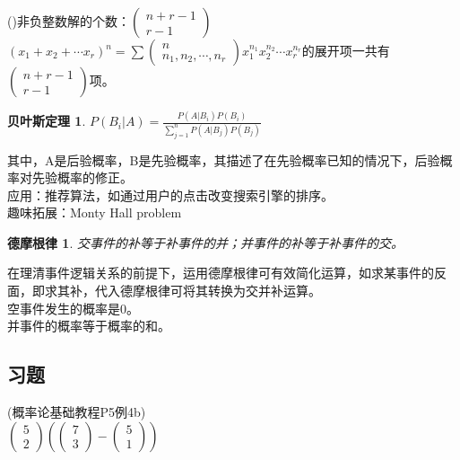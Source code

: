 \documentclass{book}%
\newtheorem{thm}{贝叶斯定理}
\newtheorem{demogen}{德摩根律}
\begin{document}
	()非负整数解的个数：$\begin{pmatrix}n+r-1\\r-1\end{pmatrix}$\\
	$(x_{1}+x_{2}+\cdots x_{r})^n=\sum\begin{pmatrix}n\\n_{1},n_{2},\cdots ,n_{r}\end{pmatrix}x_{1}^{n_{1}}x_{2}^{n_{2}}\cdots x_{r}^{n_{r}}$的展开项一共有$\begin{pmatrix}n+r-1\\r-1\end{pmatrix}$项。\\
	\begin{thm}
	$P(B_{i}|A)=\frac{P(A|B_{i})P(B_{i})}{\sum_{j=1}^{n}P(A|B_{j})P(B_{j})}$
    \end{thm}
    其中，A是后验概率，B是先验概率，其描述了在先验概率已知的情况下，后验概率对先验概率的修正。\\
    应用：推荐算法，如通过用户的点击改变搜索引擎的排序。\\
    趣味拓展：Monty Hall problem\\
    \begin{demogen}
    	交事件的补等于补事件的并；并事件的补等于补事件的交。\\
    \end{demogen}
    在理清事件逻辑关系的前提下，运用德摩根律可有效简化运算，如求某事件的反面，即求其补，代入德摩根律可将其转换为交并补运算。\\
	空事件发生的概率是0。\\
	并事件的概率等于概率的和。\\
	
	\subsection{习题}
	(概率论基础教程P5例4b)\\
	$\begin{pmatrix}5\\2\end{pmatrix}(\begin{pmatrix}7\\3\end{pmatrix}-\begin{pmatrix}5\\1\end{pmatrix})$\\
	~\\
	
\end{document}
